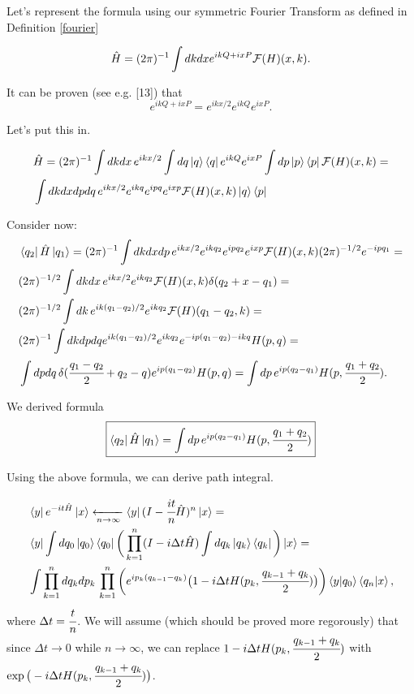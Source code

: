 \documentclass[main.tex]{subfiles}
\begin{document}
Let's represent the formula using our symmetric Fourier Transform as defined in Definition \ref{fourier}

\begin{equation}
\hat{H} = (2\pi)^{-1}\int dk dx e^{ikQ + ixP} \mathcal{F}(H)(x, k).
\end{equation}

It can be proven (see e.g. \cite{hall2013}[13]) that
\begin{equation}
e^{ikQ + ixP} = e^{ikx/2}e^{ikQ}e^{ixP}.
\end{equation}

Let's put this in.

\begin{align*}
& \hat{H} = (2\pi)^{-1}\int dk dx\, e^{ikx/2} \int dq \ket{q}\bra{q} e^{ikQ}e^{ixP} \int dp \ket{p}\bra{p}  \mathcal{F}(H)(x, k) = \\
& \int dk dx dp dq\,  e^{ikx/2} e^{ikq} e^{ipq} e^{ixp} \mathcal{F}(H)(x, k) \ket{q}\bra{p}
\end{align*}

Consider now:
\begin{align*}
& \bra{q_2} \hat{H} \ket{q_1} = (2\pi)^{-1} \int dk dx dp\,  e^{ikx/2} e^{ikq_2} e^{ipq_2} e^{ixp} \mathcal{F}(H)(x, k) (2\pi)^{-1/2}e^{-ipq_1} = \\
& (2\pi)^{-1/2} \int dk dx\,  e^{ikx/2} e^{ikq_2} \mathcal{F}(H)(x, k)
\delta(q_2 + x - q_1) = \\ 
& (2\pi)^{-1/2} \int dk \, e^{ik(q_1 - q_2)/2} e^{ikq_2} \mathcal{F}(H)(q_1 - q_2, k) = \\
& (2\pi)^{-1}  \int dk dp dq e^{ik(q_1 - q_2)/2} e^{ikq_2} e^{-ip(q_1 - q_2) -ikq} H(p, q) = \\
& \int dp dq\, \delta(\cfrac{q_1 - q_2}{2} + q_2 - q) e^{ip(q_1 - q_2)} H(p, q) = 
\int dp\, e^{ip(q_2 - q_1)} H(p, \cfrac{q_1 + q_2}{2}).
\end{align*}

We derived formula
\begin{equation}
\boxed{
\bra{q_2} \hat{H} \ket{q_1} = \int dp\, e^{ip(q_2 - q_1)} H(p, \cfrac{q_1 + q_2}{2})
}
\end{equation}

Using the above formula, we can derive path integral.

\begin{align*}
& \bra{y}e^{-it\hat{H}}\ket{x} \xleftarrow[n \to \infty]{} \bra{y}(I - \cfrac{it}{n}\hat{H})^n\ket{x} = \\
& \bra{y}\int dq_0 
\ket{q_0} \bra{q_0} \bigg( \prod_{k=1}^n  (I - i\Delta t\hat{H}) \int dq_k 
\ket{q_k} \bra{q_k}\bigg)\ket{x} = \\
& \int \prod_{k=1}^n dq_k dp_k\, \prod_{k=1}^n \bigg( e^{ip_k(q_{k-1} - q_k)} \big( 1 - i\Delta tH(p_k, \cfrac{q_{k-1} + q_k}{2})\big)\bigg) 
\bra{y}\ket{q_0}\bra{q_n}\ket{x},
\end{align*}
where $\Delta t = \cfrac{t}{n}$. We will assume (which should be proved more regorously) that since $\Delta t \to 0$ while $n\to \infty$, we can replace  $1 - i\Delta tH(p_k, \cfrac{q_{k-1} + q_k}{2})$ with $\exp\big(-i\Delta t H(p_k, \cfrac{q_{k-1} + q_k}{2})\big)$.
\end{document}

